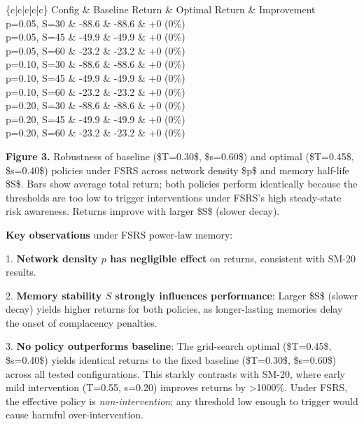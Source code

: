 \documentclass[11pt]{article}
\begin{document}
{{{\begin{table}[ht]
\centering
\begin{tabular}\{c|c|c|c|c\}
\toprule
Config \& Baseline Return \& Optimal Return \& Improvement \\
\midrule
p=0.05, S=30 \& -88.6 \& -88.6 \& +0 (0\%) \\
p=0.05, S=45 \& -49.9 \& -49.9 \& +0 (0\%) \\
p=0.05, S=60 \& -23.2 \& -23.2 \& +0 (0\%) \\
p=0.10, S=30 \& -88.6 \& -88.6 \& +0 (0\%) \\
p=0.10, S=45 \& -49.9 \& -49.9 \& +0 (0\%) \\
p=0.10, S=60 \& -23.2 \& -23.2 \& +0 (0\%) \\
p=0.20, S=30 \& -88.6 \& -88.6 \& +0 (0\%) \\
p=0.20, S=45 \& -49.9 \& -49.9 \& +0 (0\%) \\
p=0.20, S=60 \& -23.2 \& -23.2 \& +0 (0\%) \\
\bottomrule
\end{tabular}
\end{table}
\textbf{Figure 3.} Robustness of baseline (\$T=0.30\$, \$s=0.60\$) and optimal (\$T=0.45\$, \$s=0.40\$) policies under FSRS across network density \$p\$ and memory half-life \$S\$. Bars show average total return; both policies perform identically because the thresholds are too low to trigger interventions under FSRS's high steady-state risk awareness. Returns improve with larger \$S\$ (slower decay).



\textbf{Key observations} under FSRS power-law memory:

1. \textbf{Network density $p$ has negligible effect} on returns, consistent with SM-20 results.

2. \textbf{Memory stability $S$ strongly influences performance}: Larger \$S\$ (slower decay) yields higher returns for both policies, as longer-lasting memories delay the onset of complacency penalties.

3. \textbf{No policy outperforms baseline}: The grid-search optimal (\$T=0.45\$, \$s=0.40\$) yields identical returns to the fixed baseline (\$T=0.30\$, \$s=0.60\$) across all tested configurations. This starkly contrasts with SM-20, where early mild intervention (T=0.55, s=0.20) improves returns by >1000\%. Under FSRS, the effective policy is \textit{non-intervention}; any threshold low enough to trigger would cause harmful over-intervention.

}}}
\end{document}

